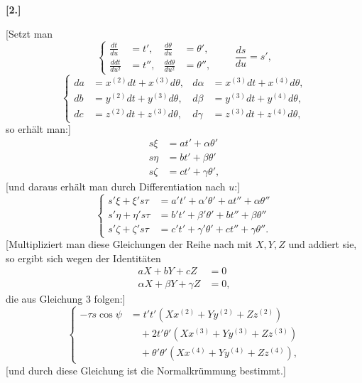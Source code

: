 %

\begin{center}\bfseries [2.]\end{center}
\noindent\hspace*{1.2em}[Setzt man
\begin{equation}\tag*{[10]}
\left\{\begin{aligned}
\frac{dt}{du}&=t',&\frac{d\theta}{du}&=\theta',\\
\frac{ddt}{du^2}&=t'',&\frac{dd\theta}{du^2}&=\theta'',
\end{aligned}\right.\qquad \frac{ds}{du}=s',
\end{equation}
\begin{equation}\tag*{[11]}
\left\{\begin{aligned}
da&=x^{(2)}dt+x^{(3)}d\theta,&d\alpha&=x^{(3)}dt+x^{(4)}d\theta,\\
db&=y^{(2)}dt+y^{(3)}d\theta,&d\beta&=y^{(3)}dt+y^{(4)}d\theta,\\
dc&=z^{(2)}dt+z^{(3)}d\theta,&d\gamma&=z^{(3)}dt+z^{(4)}d\theta,
\end{aligned}\right.
\end{equation}
so erhält man:]
\[
\begin{aligned}
s\xi&=at'+\alpha\theta'\\
s\eta&=bt'+\beta\theta'\\
s\zeta&=ct'+\gamma\theta',
\end{aligned}
\]
[und daraus erhält man durch Differentiation nach $u$:]
\begin{equation}\tag*{[12]}
\left\{\begin{aligned}
s'\xi+\xi's\tau&=a't'+\alpha'\theta'+at''+\alpha\theta''\\
s'\eta+\eta's\tau&=b't'+\beta'\theta'+bt''+\beta\theta''\\
s'\zeta+\zeta's\tau&=c't'+\gamma'\theta'+ct''+\gamma\theta''.
\end{aligned}\right.
\end{equation}
[Multipliziert man diese Gleichungen der Reihe nach mit $X,Y,Z$ und addiert sie, so ergibt sich wegen der Identitäten
\[
\begin{aligned}
aX+bY+cZ&=0\\
\alpha X+\beta Y+\gamma Z&=0,
\end{aligned}
\]
die aus Gleichung 3 folgen:]
\begin{equation}\tag*{[13]}
\left\{\begin{aligned}
-\tau s\cos\psi&=t't'(Xx^{(2)}+Yy^{(2)}+Zz^{(2)})\\
&\quad+2t'\theta'(Xx^{(3)}+Yy^{(3)}+Zz^{(3)})\\
&\quad+\theta'\theta'(Xx^{(4)}+Yy^{(4)}+Zz^{(4)}),
\end{aligned}\right.
\end{equation}
[und durch diese Gleichung ist die Normalkrümmung bestimmt.]
